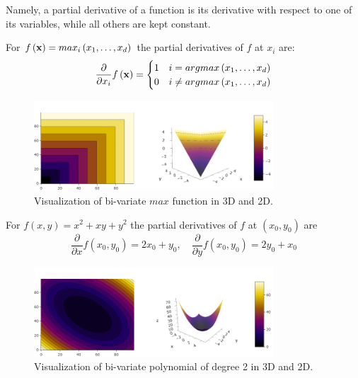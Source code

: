 Namely, a partial derivative of a function is its derivative with respect to one of its variables, while all others are kept constant. 

\begin{example}[Max]
For $f\left(\mathbf{x}\right) = max_i\left(x_1,\ldots,x_d\right)$ the partial derivatives of $f$ at $x_i$ are:
$$ \frac{\partial}{\partial x_i}f\left(\mathbf{x}\right) = \begin{cases}
	1 & i=argmax\left(x_{1},\ldots,x_{d}\right)\\
	0 & i\neq argmax\left(x_{1},\ldots,x_{d}\right)
\end{cases} $$
\end{example}

\begin{figure}[H]
	\centering
	\includegraphics[width=0.8\textwidth]{chapters/mathematical.basis/figures/max.png}
	\caption{Visualization of bi-variate $max$ function in 3D and 2D. \GitChapterOneExamples}
\end{figure}


\begin{example}[Polynomial]
For $f\left(x,y\right) = x^2 + xy + y^2$ the partial derivatives of $f$ at $\left(x_0,y_0\right)$ are  $$\frac{\partial}{\partial x}f\left(x_0,y_0\right)=2x_0+y_0, \quad\frac{\partial}{\partial y}f\left(x_0,y_0\right)=2y_0+x_0$$
\end{example}

\begin{figure}[H]
	\centering
	\includegraphics[width=0.8\textwidth]{chapters/mathematical.basis/figures/polynomial.png}  
	\caption{Visualization of bi-variate polynomial of degree 2 in 3D and 2D. \GitChapterOneExamples}
\end{figure}
 
